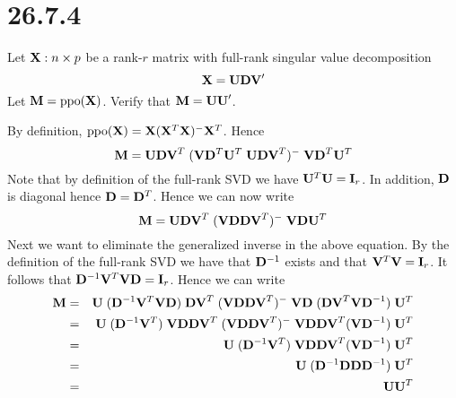 \section*{26.7.4}
Let ${\bf X}: n\times p$ be a rank-$r$ matrix with full-rank
singular value decomposition
$${\bf X}={\bf UDV}'$$
Let ${\bf M}=\mathop{\rm ppo}(\bf X)$.
Verify that ${\bf M}={\bf UU}'$.

\bigskip
\noindent
By definition,
$\mathop{\rm ppo}({\bf X})={\bf X}({\bf X}^T{\bf X})^{-{}}{\bf X}^T$.
Hence
$$
{\bf M}={\bf UDV}^T\;
({\bf V}{\bf D}^T{\bf U}^T\;{\bf UDV}^T)^{-{}}\;
{\bf VD}^T{\bf U}^T
$$
Note that by definition of the full-rank SVD we have
${\bf U}^T{\bf U}={\bf I}_r$.
In addition, $\bf D$ is diagonal hence ${\bf D}={\bf D}^T$.
Hence we can now write
$$
{\bf M}={\bf UDV}^T\;
({\bf V}{\bf D}{\bf DV}^T)^{-{}}\;
{\bf VD}{\bf U}^T
$$
Next we want to eliminate the generalized inverse in the
above equation.
By the definition of the full-rank SVD we have that
${\bf D}^{-1}$ exists and that
${\bf V}^T{\bf V}={\bf I}_r$.
It follows that ${\bf D}^{-1}{\bf V}^T{\bf VD}={\bf I}_r$.
Hence we can write
\begin{eqnarray*}
{\bf M}&=&
{\bf U}\;
({\bf D}^{-1}{\bf V}^T{\bf VD})\;
{\bf DV}^T\;
({\bf V}{\bf D}{\bf DV}^T)^{-{}}\;
{\bf VD}\;
({\bf DV}^T{\bf VD}^{-1})\;
{\bf U}^T\\
&=&
{\bf U}\;
({\bf D}^{-1}{\bf V}^T)\;
{\bf VDDV}^T\;
({\bf V}{\bf D}{\bf DV}^T)^{-{}}\;
{\bf VDDV}^T
({\bf VD}^{-1})\;
{\bf U}^T\\
&=&
{\bf U}\;
({\bf D}^{-1}{\bf V}^T)\;
{\bf VDDV}^T
({\bf VD}^{-1})\;
{\bf U}^T\\
&=&
{\bf U}\;
({\bf D}^{-1}{\bf DD}{\bf D}^{-1})\;
{\bf U}^T\\
&=&{\bf UU}^T
\end{eqnarray*}
